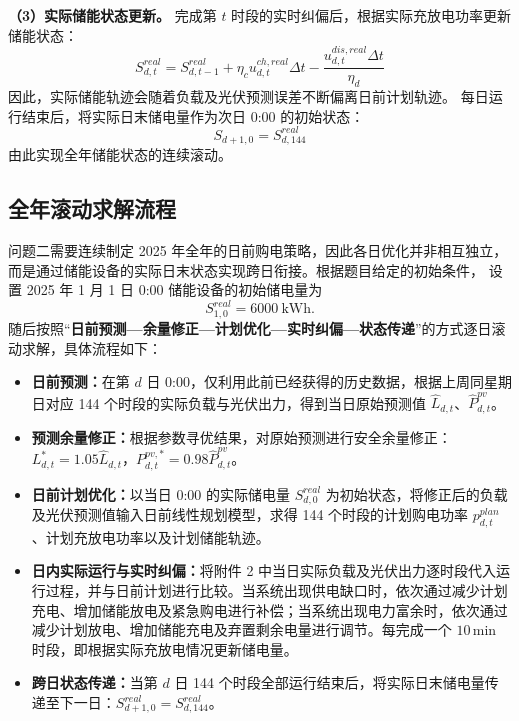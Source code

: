 \textbf{（3）实际储能状态更新。} 完成第 $t$ 时段的实时纠偏后，根据实际充放电功率更新储能状态：
\begin{equation}
S^{real}_{d,t}=S^{real}_{d,t-1}+\eta_c u^{ch,real}_{d,t}\Delta t-\frac{u^{dis,real}_{d,t}\Delta t}{\eta_d}
\end{equation}
因此，实际储能轨迹会随着负载及光伏预测误差不断偏离日前计划轨迹。
每日运行结束后，将实际日末储电量作为次日 0:00 的初始状态：
\begin{equation}
S_{d+1,0}=S^{real}_{d,144}
\end{equation}
由此实现全年储能状态的连续滚动。

\subsection{全年滚动求解流程}
问题二需要连续制定 2025 年全年的日前购电策略，因此各日优化并非相互独立，
而是通过储能设备的实际日末状态实现跨日衔接。根据题目给定的初始条件，
设置 2025 年 1 月 1 日 0:00 储能设备的初始储电量为
\begin{equation}
S^{real}_{1,0}=6000\ \text{kWh}.
\end{equation}
随后按照“\textbf{日前预测—余量修正—计划优化—实时纠偏—状态传递}”的方式逐日滚动求解，具体流程如下：

\begin{itemize}[leftmargin=2em, itemsep=0.2em]
\item \textbf{日前预测：}在第 $d$ 日 0:00，仅利用此前已经获得的历史数据，根据上周同星期日对应 144 个时段的实际负载与光伏出力，得到当日原始预测值 $\hat{L}_{d,t}$、$\hat{P}^{pv}_{d,t}$。
\item \textbf{预测余量修正：}根据参数寻优结果，对原始预测进行安全余量修正：$L^{*}_{d,t}=1.05\hat{L}_{d,t}$，$P^{pv,*}_{d,t}=0.98\hat{P}^{pv}_{d,t}$。
\item \textbf{日前计划优化：}以当日 0:00 的实际储电量 $S^{real}_{d,0}$ 为初始状态，将修正后的负载及光伏预测值输入日前线性规划模型，求得 144 个时段的计划购电功率 $p^{plan}_{d,t}$、计划充放电功率以及计划储能轨迹。
\item \textbf{日内实际运行与实时纠偏：}将附件 2 中当日实际负载及光伏出力逐时段代入运行过程，并与日前计划进行比较。当系统出现供电缺口时，依次通过减少计划充电、增加储能放电及紧急购电进行补偿；当系统出现电力富余时，依次通过减少计划放电、增加储能充电及弃置剩余电量进行调节。每完成一个 $10\,$min 时段，即根据实际充放电情况更新储电量。
\item \textbf{跨日状态传递：}当第 $d$ 日 144 个时段全部运行结束后，将实际日末储电量传递至下一日：$S^{real}_{d+1,0}=S^{real}_{d,144}$。
\end{itemize}

